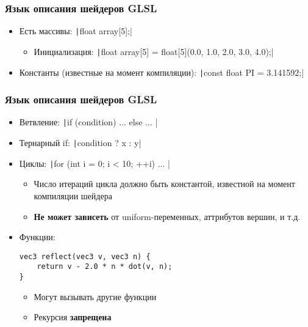 \documentclass[10pt]{beamer}
\begin{document}
\begin{frame}[fragile]
\frametitle{Язык описания шейдеров GLSL}
\begin{itemize}
\item Есть массивы: \texttt|float array[5];|
\pause
\begin{itemize}
\item Инициализация: \texttt|float array[5] = float[5](0.0, 1.0, 2.0, 3.0, 4.0);|
\end{itemize}
\pause
\item Константы (известные на момент компиляции): \texttt|const float PI = 3.141592;|
\end{itemize}
\end{frame}

\begin{frame}[fragile]
\frametitle{Язык описания шейдеров GLSL}
\begin{itemize}
\item Ветвление: \texttt|if (condition) { ... } else { ... }|
\pause
\item Тернарный if: \texttt|condition ? x : y|
\pause
\item Циклы: \texttt|for (int i = 0; i < 10; ++i) { ... }|
\begin{itemize}
\item Число итераций цикла должно быть константой, известной на момент компиляции шейдера
\item \alert{\textbf{Не может зависеть}} от uniform-переменных, аттрибутов вершин, и т.д.
\end{itemize}
\pause
{}
\item Функции: \begin{verbatim}
vec3 reflect(vec3 v, vec3 n) {
    return v - 2.0 * n * dot(v, n);
}
\end{verbatim}
\pause
\begin{itemize}
\item Могут вызывать другие функции
\pause
\item Рекурсия \alert{\textbf{запрещена}}
\end{itemize}
\end{itemize}
\end{frame}
\end{document}
